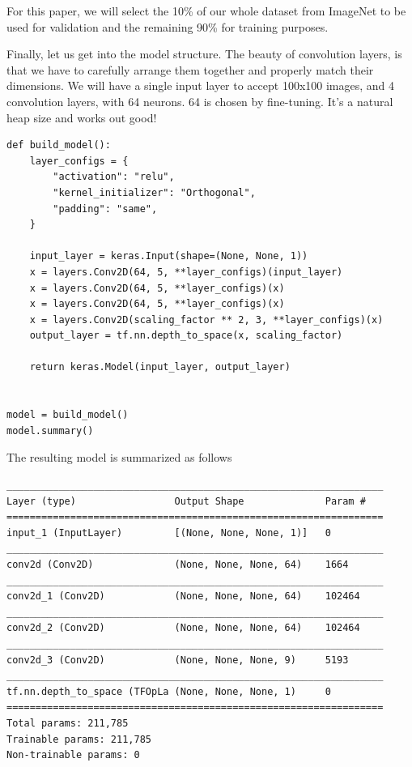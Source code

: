 \documentclass[12pt]{article}
\begin{document}
For this paper, we will select the 10\% of our whole dataset from ImageNet to be used
for validation and the remaining 90\% for training purposes.

Finally, let us get into the model structure. The beauty of convolution layers, is
that we have to carefully arrange them together and properly match their dimensions.
We will have a single input layer to accept 100x100 images, and 4 convolution layers,
with 64 neurons. 64 is chosen by fine-tuning. It's a natural heap size and works out
good!

\begin{verbatim}
def build_model():
    layer_configs = {
        "activation": "relu",
        "kernel_initializer": "Orthogonal",
        "padding": "same",
    }

    input_layer = keras.Input(shape=(None, None, 1))
    x = layers.Conv2D(64, 5, **layer_configs)(input_layer)
    x = layers.Conv2D(64, 5, **layer_configs)(x)
    x = layers.Conv2D(64, 5, **layer_configs)(x)
    x = layers.Conv2D(scaling_factor ** 2, 3, **layer_configs)(x)
    output_layer = tf.nn.depth_to_space(x, scaling_factor)

    return keras.Model(input_layer, output_layer)


model = build_model()
model.summary()
\end{verbatim}

The resulting model is summarized as follows

\begin{verbatim}
_________________________________________________________________
Layer (type)                 Output Shape              Param #   
=================================================================
input_1 (InputLayer)         [(None, None, None, 1)]   0         
_________________________________________________________________
conv2d (Conv2D)              (None, None, None, 64)    1664      
_________________________________________________________________
conv2d_1 (Conv2D)            (None, None, None, 64)    102464    
_________________________________________________________________
conv2d_2 (Conv2D)            (None, None, None, 64)    102464    
_________________________________________________________________
conv2d_3 (Conv2D)            (None, None, None, 9)     5193      
_________________________________________________________________
tf.nn.depth_to_space (TFOpLa (None, None, None, 1)     0         
=================================================================
Total params: 211,785
Trainable params: 211,785
Non-trainable params: 0
\end{verbatim}
\end{document}
